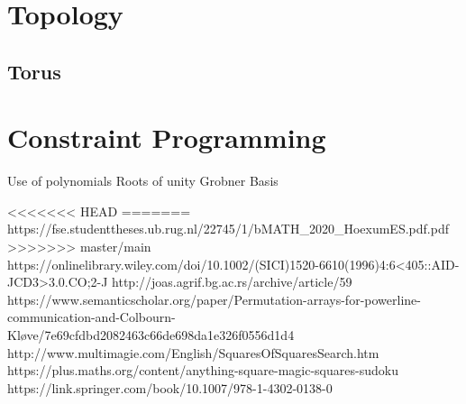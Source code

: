 \documentclass[a4paper,12pt]{article}
\begin{document}
\section{Topology}
	\subsection{Torus}
\section{Constraint Programming}
	Use of polynomials
	Roots of unity
	Grobner Basis

\begin{thebibliography}{100}
<<<<<<< HEAD
=======
	 https://fse.studenttheses.ub.rug.nl/22745/1/bMATH_2020_HoexumES.pdf.pdf
>>>>>>> master/main
	 https://onlinelibrary.wiley.com/doi/10.1002/(SICI)1520-6610(1996)4:6<405::AID-JCD3>3.0.CO;2-J
	 http://joas.agrif.bg.ac.rs/archive/article/59
	 https://www.semanticscholar.org/paper/Permutation-arrays-for-powerline-communication-and-Colbourn-Kløve/7e69cfdbd2082463c66de698da1e326f0556d1d4
	 http://www.multimagie.com/English/SquaresOfSquaresSearch.htm
	 https://plus.maths.org/content/anything-square-magic-squares-sudoku
	 https://link.springer.com/book/10.1007/978-1-4302-0138-0
\end{thebibliography}
\end{document}
